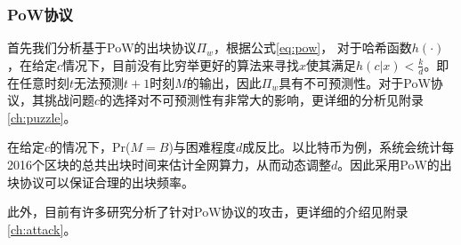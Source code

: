 \subsubsection{PoW协议}

首先我们分析基于PoW的出块协议$\Pi_w$，根据公式\ref{eq:pow}，
对于哈希函数$h(\cdot)$，在给定$c$情况下，目前没有比穷举更好的算法来寻找$x$使其满足$h(c|x)<\frac{k}{d}$\cite{gilbert2003security}。即在任意时刻$t$无法预测$t+1$时刻$M$的输出，因此$\Pi_w$具有不可预测性。对于PoW协议，其挑战问题$c$的选择对不可预测性有非常大的影响，更详细的分析见附录\ref{ch:puzzle}。


在给定$c$的情况下，Pr($M=B$)与困难程度$d$成反比。以比特币为例，系统会统计每2016个区块的总共出块时间来估计全网算力，从而动态调整$d$。因此采用PoW的出块协议可以保证合理的出块频率。

此外，目前有许多研究分析了针对PoW协议的攻击，更详细的介绍见附录\ref{ch:attack}。







